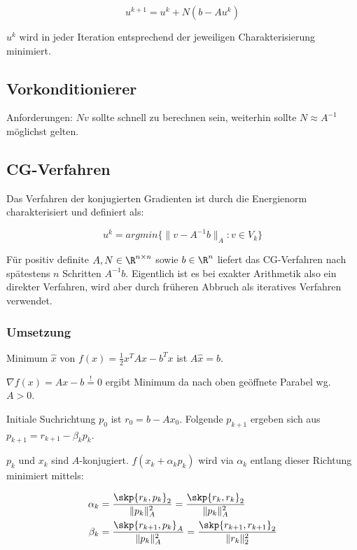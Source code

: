 \vspace{-2mm}
$$u^{k+1} = u^k + N(b-Au^k)$$

$u^k$ wird in jeder Iteration entsprechend der jeweiligen Charakterisierung minimiert.

\subsection*{Vorkonditionierer}

Anforderungen: $Nv$ sollte schnell zu berechnen sein, weiterhin sollte $N \approx A^{-1}$ möglichst gelten.

\subsection*{CG-Verfahren}

Das Verfahren der konjugierten Gradienten ist durch die Energienorm charakterisiert und definiert als:

\vspace{-2mm}
$$u^k = argmin\{\|v-A^{-1}b\|_A : v \in V_k\}$$

Für positiv definite $A, N \in \R^{n \times n}$ sowie $b \in \R^n$ liefert das CG-Verfahren nach spätestens $n$ Schritten $A^{-1}b$. Eigentlich ist es bei exakter Arithmetik also ein direkter Verfahren, wird aber durch früheren Abbruch als iteratives Verfahren verwendet.

\subsubsection*{Umsetzung}

Minimum $\hat x$ von $f(x)=\frac{1}{2} x^TAx - b^Tx$ ist $A\hat x = b$.

$\nabla f(x) = Ax - b \overset{!}{=} 0$ ergibt Minimum da nach oben geöffnete Parabel wg. $A > 0$.

Initiale Suchrichtung $p_0$ ist $r_0 = b - Ax_0$. Folgende $p_{k+1}$ ergeben sich aus $p_{k+1} = r_{k+1} - \beta_k p_k$.

$p_k$ und $x_k$ sind $A$-konjugiert. $f(x_k + \alpha_k p_k)$ wird via $\alpha_k$ entlang dieser Richtung minimiert mittels:

\vspace{-4mm}
\begin{align*}
\alpha_k &= \frac{\skp{r_k,p_k}_2}{\|p_k\|_A^2}     = \frac{\skp{r_k,r_k}_2}{\|p_k\|_A^2} \\
\beta_k  &= \frac{\skp{r_{k+1},p_k}_A}{\|p_k\|_A^2} = \frac{\skp{r_{k+1},r_{k+1}}_2}{\|r_k\|_2^2}
\end{align*}

